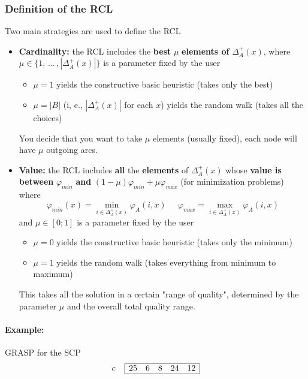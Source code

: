 \subsubsection{Definition of the RCL}
Two main strategies are used to define the RCL
\begin{itemize}
	\item \textbf{Cardinality:} the RCL includes the \textbf{best} $\mu$ \textbf{elements of} $\Delta_A^+ (x)$, where $\mu \in \{1,\, ... \, , |\Delta_A^+(x)|\}$ is a parameter fixed by the user
	\begin{itemize}
		\item $\mu = 1$ yields the constructive basic heuristic (takes only the best)
		\item $\mu = |B|$ (i, e., $|\Delta_A^+ (x)|$ for each $x$) yields the random walk (takes all the choices)
	\end{itemize}
	You decide that you want to take $\mu$ elements (usually fixed), each node will have $\mu$ outgoing arcs.\\
	
	\item \textbf{Value:} the RCL includes \textbf{all} the \textbf{elements} of $\Delta_A^+ (x)$ whose \textbf{value is between} $\varphi_{min}$ \textbf{and} $(1 − \mu) \varphi_{min} + \mu \varphi_{max}$ (for minimization problems) where
	$$ \varphi_{min} (x) = \min_{i \in \Delta_A^+ (x)} \varphi_A (i,x) \;\;\;\;\; \varphi_{max} = \max_{i \in \Delta_A^+ (x)} \varphi_A (i,x) $$
	and $\mu \in [0; 1]$ is a parameter fixed by the user
	\begin{itemize}
		\item $\mu = 0$ yields the constructive basic heuristic (takes only the minimum)
		\item $\mu = 1$ yields the random walk (takes everything from minimum to maximum)
	\end{itemize}
	This takes all the solution in a certain "range of quality", determined by the parameter $\mu$ and the overall total quality range.\\
\end{itemize}

\newpage

\paragraph{Example:} GRASP for the SCP 
$$
c \;\;\;\;
\begin{array}{| c c c c c |}
	\hline
	25 & 6 & 8 & 24 & 12 \\
	\hline
\end{array}
$$

